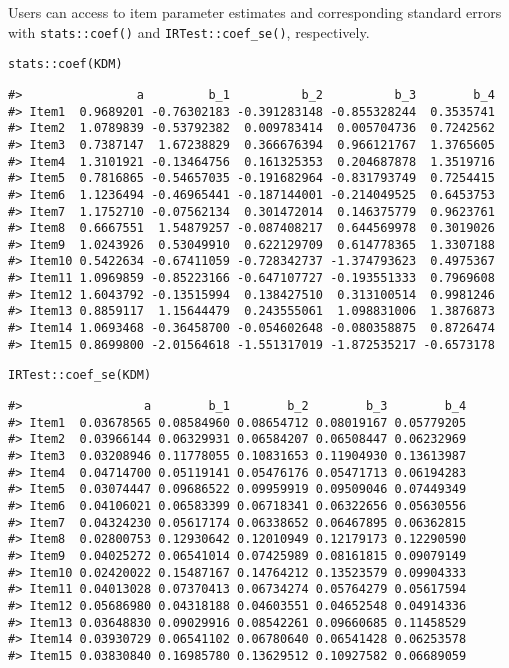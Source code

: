 Users can access to item parameter estimates and corresponding standard
errors with \texttt{stats::coef()} and \texttt{IRTest::coef\_se()}, respectively.

\begin{verbatim}
stats::coef(KDM)
\end{verbatim}

\begin{verbatim}
#>                a         b_1          b_2          b_3        b_4
#> Item1  0.9689201 -0.76302183 -0.391283148 -0.855328244  0.3535741
#> Item2  1.0789839 -0.53792382  0.009783414  0.005704736  0.7242562
#> Item3  0.7387147  1.67238829  0.366676394  0.966121767  1.3765605
#> Item4  1.3101921 -0.13464756  0.161325353  0.204687878  1.3519716
#> Item5  0.7816865 -0.54657035 -0.191682964 -0.831793749  0.7254415
#> Item6  1.1236494 -0.46965441 -0.187144001 -0.214049525  0.6453753
#> Item7  1.1752710 -0.07562134  0.301472014  0.146375779  0.9623761
#> Item8  0.6667551  1.54879257 -0.087408217  0.644569978  0.3019026
#> Item9  1.0243926  0.53049910  0.622129709  0.614778365  1.3307188
#> Item10 0.5422634 -0.67411059 -0.728342737 -1.374793623  0.4975367
#> Item11 1.0969859 -0.85223166 -0.647107727 -0.193551333  0.7969608
#> Item12 1.6043792 -0.13515994  0.138427510  0.313100514  0.9981246
#> Item13 0.8859117  1.15644479  0.243555061  1.098831006  1.3876873
#> Item14 1.0693468 -0.36458700 -0.054602648 -0.080358875  0.8726474
#> Item15 0.8699800 -2.01564618 -1.551317019 -1.872535217 -0.6573178
\end{verbatim}

\begin{verbatim}
IRTest::coef_se(KDM)
\end{verbatim}

\begin{verbatim}
#>                 a        b_1        b_2        b_3        b_4
#> Item1  0.03678565 0.08584960 0.08654712 0.08019167 0.05779205
#> Item2  0.03966144 0.06329931 0.06584207 0.06508447 0.06232969
#> Item3  0.03208946 0.11778055 0.10831653 0.11904930 0.13613987
#> Item4  0.04714700 0.05119141 0.05476176 0.05471713 0.06194283
#> Item5  0.03074447 0.09686522 0.09959919 0.09509046 0.07449349
#> Item6  0.04106021 0.06583399 0.06718341 0.06322656 0.05630556
#> Item7  0.04324230 0.05617174 0.06338652 0.06467895 0.06362815
#> Item8  0.02800753 0.12930642 0.12010949 0.12179173 0.12290590
#> Item9  0.04025272 0.06541014 0.07425989 0.08161815 0.09079149
#> Item10 0.02420022 0.15487167 0.14764212 0.13523579 0.09904333
#> Item11 0.04013028 0.07370413 0.06734274 0.05764279 0.05617594
#> Item12 0.05686980 0.04318188 0.04603551 0.04652548 0.04914336
#> Item13 0.03648830 0.09029916 0.08542261 0.09660685 0.11458529
#> Item14 0.03930729 0.06541102 0.06780640 0.06541428 0.06253578
#> Item15 0.03830840 0.16985780 0.13629512 0.10927582 0.06689059
\end{verbatim}

